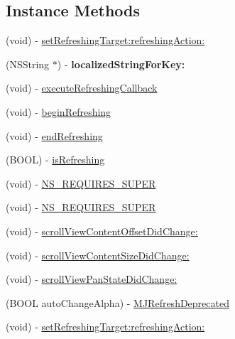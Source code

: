 \subsection*{Instance Methods}
\begin{DoxyCompactItemize}
\item 
(void) -\/ \mbox{\hyperlink{interface_m_j_refresh_component_a9af3d33329e4ed8f7aed41eed601be99}{set\+Refreshing\+Target\+:refreshing\+Action\+:}}
\item 
\mbox{\label{interface_m_j_refresh_component_affa666b6aa57b1c781a55ba2069cf319}} 
(N\+S\+String $\ast$) -\/ {\bfseries localized\+String\+For\+Key\+:}
\item 
(void) -\/ \mbox{\hyperlink{interface_m_j_refresh_component_a618a54cc5f6bad921ebcbfdc637fb892}{execute\+Refreshing\+Callback}}
\item 
(void) -\/ \mbox{\hyperlink{interface_m_j_refresh_component_a0f34a467638a93530b64ae1237785b0a}{begin\+Refreshing}}
\item 
(void) -\/ \mbox{\hyperlink{interface_m_j_refresh_component_a609c032e2e29754a553b78b544b40223}{end\+Refreshing}}
\item 
(B\+O\+OL) -\/ \mbox{\hyperlink{interface_m_j_refresh_component_abe507257c3d1ff768ff51ce37265fba3}{is\+Refreshing}}
\item 
(void) -\/ \mbox{\hyperlink{interface_m_j_refresh_component_a3c89effddae59a40b856391db8985aba}{N\+S\+\_\+\+R\+E\+Q\+U\+I\+R\+E\+S\+\_\+\+S\+U\+P\+ER}}
\item 
(void) -\/ \mbox{\hyperlink{interface_m_j_refresh_component_a3c89effddae59a40b856391db8985aba}{N\+S\+\_\+\+R\+E\+Q\+U\+I\+R\+E\+S\+\_\+\+S\+U\+P\+ER}}
\item 
(void) -\/ \mbox{\hyperlink{interface_m_j_refresh_component_a9ca510683802fd76db4ab79ad31cd6b9}{scroll\+View\+Content\+Offset\+Did\+Change\+:}}
\item 
(void) -\/ \mbox{\hyperlink{interface_m_j_refresh_component_af32e7cdaf4d1503b551e77baa8266aa5}{scroll\+View\+Content\+Size\+Did\+Change\+:}}
\item 
(void) -\/ \mbox{\hyperlink{interface_m_j_refresh_component_a16e5ed763451362a1bc76caa4ed761b1}{scroll\+View\+Pan\+State\+Did\+Change\+:}}
\item 
(B\+O\+OL auto\+Change\+Alpha) -\/ \mbox{\hyperlink{interface_m_j_refresh_component_afa4faed890bbcd4a6926c69c6d443196}{M\+J\+Refresh\+Deprecated}}
\item 
(void) -\/ \mbox{\hyperlink{interface_m_j_refresh_component_a9af3d33329e4ed8f7aed41eed601be99}{set\+Refreshing\+Target\+:refreshing\+Action\+:}}

\end{DoxyCompactItemize}
